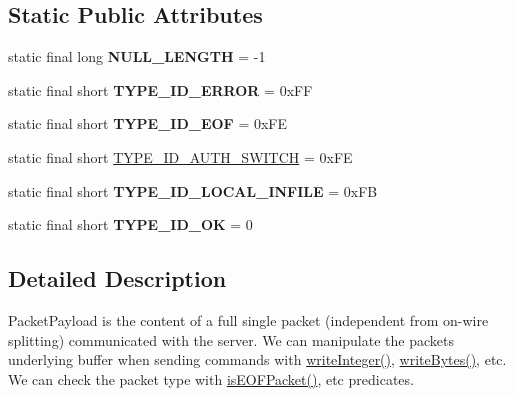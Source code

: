 \subsection*{Static Public Attributes}
\begin{DoxyCompactItemize}
\item 
\mbox{\label{classcom_1_1mysql_1_1cj_1_1protocol_1_1a_1_1_native_packet_payload_aa433964e3274cf5500def5db6794b18d}} 
static final long {\bfseries N\+U\+L\+L\+\_\+\+L\+E\+N\+G\+TH} = -\/1
\item 
\mbox{\label{classcom_1_1mysql_1_1cj_1_1protocol_1_1a_1_1_native_packet_payload_aaa3e674a10a430e623fe2b836dbd63c3}} 
static final short {\bfseries T\+Y\+P\+E\+\_\+\+I\+D\+\_\+\+E\+R\+R\+OR} = 0x\+FF
\item 
\mbox{\label{classcom_1_1mysql_1_1cj_1_1protocol_1_1a_1_1_native_packet_payload_a5e6f1efc8b1c366b74219d7de151b15e}} 
static final short {\bfseries T\+Y\+P\+E\+\_\+\+I\+D\+\_\+\+E\+OF} = 0x\+FE
\item 
static final short \mbox{\hyperlink{classcom_1_1mysql_1_1cj_1_1protocol_1_1a_1_1_native_packet_payload_a7877c9cad9d781274ac6c8efa78cfbce}{T\+Y\+P\+E\+\_\+\+I\+D\+\_\+\+A\+U\+T\+H\+\_\+\+S\+W\+I\+T\+CH}} = 0x\+FE
\item 
\mbox{\label{classcom_1_1mysql_1_1cj_1_1protocol_1_1a_1_1_native_packet_payload_aeda83ee2cea335a96baa7a12e048c6bc}} 
static final short {\bfseries T\+Y\+P\+E\+\_\+\+I\+D\+\_\+\+L\+O\+C\+A\+L\+\_\+\+I\+N\+F\+I\+LE} = 0x\+FB
\item 
\mbox{\label{classcom_1_1mysql_1_1cj_1_1protocol_1_1a_1_1_native_packet_payload_a6c870c37287d975707cae76682221e08}} 
static final short {\bfseries T\+Y\+P\+E\+\_\+\+I\+D\+\_\+\+OK} = 0
\end{DoxyCompactItemize}


\subsection{Detailed Description}
Packet\+Payload is the content of a full single packet (independent from on-\/wire splitting) communicated with the server. We can manipulate the packet\textquotesingle{}s underlying buffer when sending commands with \mbox{\hyperlink{classcom_1_1mysql_1_1cj_1_1protocol_1_1a_1_1_native_packet_payload_ad9d225e02fbb482471592f99b5a16958}{write\+Integer()}}, \mbox{\hyperlink{classcom_1_1mysql_1_1cj_1_1protocol_1_1a_1_1_native_packet_payload_add0512948b6c89c36d0e88b75666e181}{write\+Bytes()}}, etc. We can check the packet type with \mbox{\hyperlink{classcom_1_1mysql_1_1cj_1_1protocol_1_1a_1_1_native_packet_payload_aebc952e2498deecf37b0b02c313b7bb8}{is\+E\+O\+F\+Packet()}}, etc predicates.

